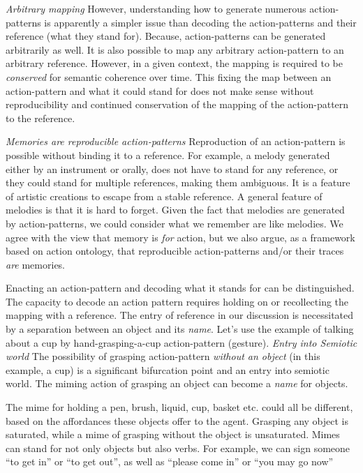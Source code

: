 \emph{Arbitrary mapping} However, understanding how to generate numerous action-patterns is apparently a simpler issue than decoding the action-patterns and their reference (what they stand for). Because, action-patterns can be generated arbitrarily as well. It is also possible to map any arbitrary action-pattern to an arbitrary reference. However, in a given context, the mapping is required to be \textit{conserved} for semantic coherence over time. This fixing the map between an action-pattern and what it could stand for does not make sense without reproducibility and continued conservation of the mapping of the action-pattern to the reference. 

\emph{Memories are reproducible action-patterns} Reproduction of an action-pattern is possible without binding it to a reference. For example, a melody generated either by an instrument or orally, does not have to stand for any reference, or they could stand for multiple references, making them ambiguous. It is a feature of artistic creations to escape from a stable reference. A general feature of melodies is that it is hard to forget. Given the fact that melodies are generated by action-patterns, we could consider what we remember are like melodies. We agree with the view that memory is \textit{for} action\cite{glenberg1997memory}, but we also argue, as a framework based on action ontology, that reproducible action-patterns and/or their traces \textit{are} memories. 

Enacting an action-pattern and decoding what it stands for can be distinguished. 
The capacity to decode an action pattern requires holding on or recollecting the mapping with a reference. 
The entry of reference in our discussion is necessitated by a separation between an object and its \textit{name}.
Let's use the example of talking about a cup by hand-grasping-a-cup action-pattern (gesture). 
\emph{Entry into Semiotic world} The possibility of grasping action-pattern \textit{without an object} (in this example, a cup) is a significant bifurcation point and an entry into semiotic world. 
The miming action of grasping an object can become a \textit{name} for objects. 

The mime for holding a pen, brush, liquid, cup, basket etc. could all be different, based on the affordances these objects offer to the agent. Grasping any object is saturated, while a mime of grasping without the object is unsaturated. 
Mimes can stand for not only objects but also verbs. For example, we can sign someone ``to get in'' or ``to get out'', as well as ``please come in'' or ``you may go now''

